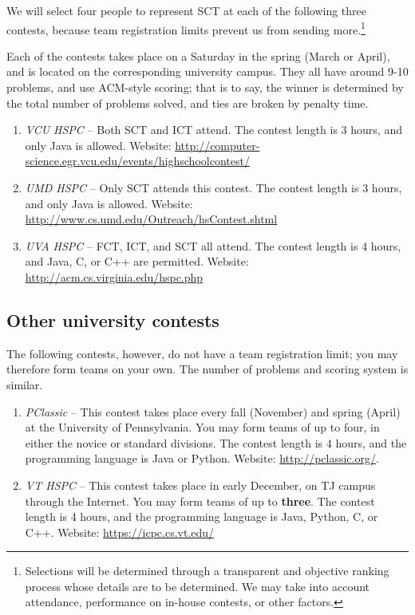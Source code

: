 \documentclass{article}
\begin{document}
We will select four people to represent SCT at each of the following three contests, because team registration limits prevent us from sending more.\footnote{Selections will be determined through a transparent and objective ranking process whose details are to be determined. We may take into account attendance, performance on in-house contests, or other factors.}

Each of the contests takes place on a Saturday in the spring (March or April), and is located on the corresponding university campus. They all have around 9-10 problems, and use ACM-style scoring; that is to say, the winner is determined by the total number of problems solved, and ties are broken by penalty time.

\begin{enumerate}
    \item \textit{VCU HSPC} --
    Both SCT and ICT attend. The contest length is 3 hours, and only Java is allowed.
    Website: \url{http://computer-science.egr.vcu.edu/events/highschoolcontest/}

    \item \textit{UMD HSPC} --
    Only SCT attends this contest. The contest length is 3 hours, and only Java is allowed.
    Website:
    \url{http://www.cs.umd.edu/Outreach/hsContest.shtml}
    
    \item \textit{UVA HSPC} --
    FCT, ICT, and SCT all attend. The contest length is 4 hours, and Java, C, or C++ are permitted.
    Website: \url{http://acm.cs.virginia.edu/hspc.php}
\end{enumerate}


\subsection{Other university contests}

The following contests, however, do not have a team registration limit; you may therefore form teams on your own. The number of problems and scoring system is similar.

\begin{enumerate}
    \item \textit{PClassic} -- This contest takes place every fall (November) and spring (April) at the University of Pennsylvania. You may form teams of up to four, in either the novice or standard divisions. The contest length is 4 hours, and the programming language is Java or Python. Website: \url{http://pclassic.org/}.
    \item \textit{VT HSPC} -- This contest takes place in early December, on TJ campus through the Internet. You may form teams of up to \textbf{three}. The contest length is 4 hours, and the programming language is Java, Python, C, or C++. Website: \url{https://icpc.cs.vt.edu/}
\end{enumerate}
\end{document}
